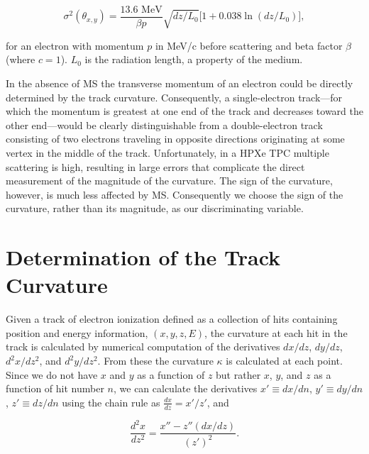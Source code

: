 \documentclass{JINST}
\begin{document}
\begin{equation}\label{eqn_mscat}
\sigma^{2}(\theta_{x,y}) = \frac{13.6\,\,\mathrm{MeV}}{\beta p}\sqrt{dz/L_{0}}\bigl[1 + 0.038\ln(dz/L_{0})\bigr],
\end{equation}

\noindent for an electron with momentum $p$ in MeV/c before scattering and beta factor $\beta$ (where $c = 1$).  $L_{0}$ is the radiation length, a property of the medium. 

In the absence of MS the transverse momentum of an electron could be directly determined by the track
curvature. Consequently, a single-electron track---for which the momentum is greatest at one end of the
track and decreases toward the other end---would be clearly distinguishable
from a double-electron track consisting of two electrons traveling in opposite directions originating at some vertex in the middle of the track.  Unfortunately, in a HPXe TPC multiple scattering is high, resulting in large errors that complicate the direct measurement of the magnitude of the curvature. The sign of the curvature, however, is much less affected by MS.
Consequently we choose the sign of the curvature, rather than its magnitude, as our discriminating variable.  

\section{Determination of the Track Curvature}\label{sec.curvature}
Given a track of electron ionization defined as a collection of hits containing position and energy information, $(x,y,z,E)$, the curvature at each hit in the track is calculated by numerical computation of the derivatives $dx/dz$, $dy/dz$, $d^2x/dz^2$, and $d^2y/dz^2$.  From these the curvature $\kappa$ is calculated at each point.  Since we do not have $x$ and $y$ as a function of $z$ but rather $x$, $y$, and $z$ as a function of hit number $n$, we can calculate the derivatives $x' \equiv dx/dn$, $y' \equiv dy/dn$, $z' \equiv dz/dn$ using the chain rule as $\frac{dx}{dz} = x'/z'$, and

\begin{equation}
\frac{d^2x}{dz^2} = \frac{x'' - z''(dx/dz)}{(z')^2}.
\end{equation}
\end{document}

